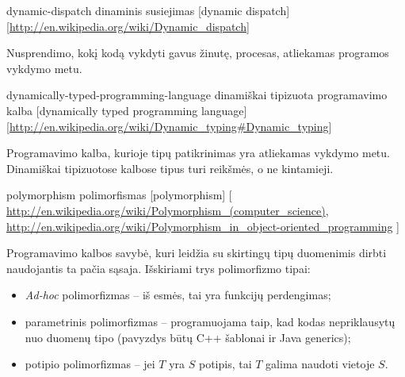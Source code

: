 \begin{glossary}
  \begin{entry}%
    {dynamic-dispatch}%
    {dinaminis susiejimas}%
    [dynamic dispatch]%
    [\url{http://en.wikipedia.org/wiki/Dynamic_dispatch}]

    Nusprendimo, kokį kodą vykdyti gavus žinutę, procesas,
    atliekamas programos vykdymo metu.

  \end{entry}

  \begin{entry}%
    {dynamically-typed-programming-language}%
    {dinamiškai tipizuota programavimo kalba}%
    [dynamically typed programming language]%
    [\url{http://en.wikipedia.org/wiki/Dynamic_typing\#Dynamic_typing}]

    Programavimo kalba, kurioje tipų patikrinimas yra atliekamas vykdymo
    metu. Dinamiškai tipizuotose kalbose tipus turi reikšmės, o ne
    kintamieji.
    
  \end{entry}

  \begin{entry}%
    {polymorphism}%
    {polimorfismas}%
    [polymorphism]%
    [%
    \url{http://en.wikipedia.org/wiki/Polymorphism_(computer_science)}, %
    \url{http://en.wikipedia.org/wiki/Polymorphism_in_object-oriented_programming}%
    ]%

    Programavimo kalbos savybė, kuri leidžia su skirtingų tipų duomenimis
    dirbti naudojantis ta pačia sąsaja. Išskiriami trys polimorfizmo tipai:
    \begin{itemize}
      \item \emph{Ad-hoc} polimorfizmas  –
        iš esmės, tai yra funkcijų perdengimas;
      \item parametrinis polimorfizmas  –
        programuojama taip, kad kodas nepriklausytų nuo duomenų tipo
        (pavyzdys būtų C++ šablonai ir Java generics);
      \item potipio polimorfizmas  – 
        jei $T$ yra $S$ potipis, tai $T$ galima naudoti vietoje $S$.
    \end{itemize}
    
  \end{entry}
\end{glossary}


